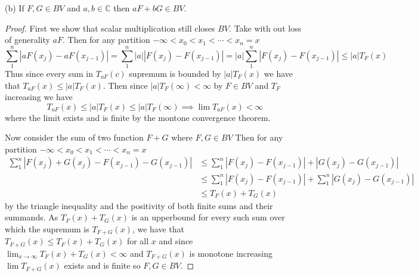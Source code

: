 \documentclass[11pt]{amsart}
\theoremstyle{definition}
\numberwithin{theorem}{section}
\numberwithin{definition}{section}
\numberwithin{equation}{section}
\begin{document}
(b) If $F, G \in BV$ and $a,b \in \mathbb{C}$ then $aF + bG \in BV.$
\begin{proof}
	First we show that scalar multiplication still closes $BV$. Take with out loss of generality $aF.$ Then 
	for any partition $-\infty < x_0 < x_1 < \cdots < x_n = x$
	\begin{equation*}
		\sum_{1}^n |aF(x_j) - aF(x_{j-1})| = \sum_{1}^n |a||F(x_j) - F(x_{j-1})| = |a|\sum_{1}^n |F(x_j) - F(x_{j-1})| \leq |a|T_F(x)
	\end{equation*}
	Thus since every sum in $T_{aF}(c)$ supremum is bounded by $|a|T_F(x)$ we have that $T_{aF}(x) \leq |a|T_F(x)$. Then since $ |a|T_F(\infty) < \infty$ by $F \in BV$ and $T_F$ increasing we have 
	\begin{equation*}
		T_{aF}(x) \leq   |a|T_F(x) \leq  |a|T_F(\infty) \implies \lim T_{aF}(x) < \infty
	\end{equation*}
	where the limit exists and is finite by the montone convergence theorem.

	Now consider the sum of two function $F +G$ where $F,G \in BV$
	Then 
	for any partition $-\infty < x_0 < x_1 < \cdots < x_n = x$
	\begin{equation*}
	\begin{aligned}
		\sum_{1}^n |F(x_j) + G(x_j)  - F(x_{j-1}) - G(x_{j-1})| &\leq  \sum_{1}^n |F(x_j) - F(x_{j-1})| + |G(x_j)   - G(x_{j-1})| \\
		&\leq \sum_{1}^n |F(x_j) - F(x_{j-1})| + \sum_{1}^n  |G(x_j)   - G(x_{j-1})| \\
		&\leq T_F(x) + T_G(x)
	\end{aligned}
	\end{equation*}
	by the triangle inequality and the positivity of both finite sums and their summands. As $T_F(x) + T_G(x)$ is an upperbound
	for every such sum over which the supremum is $T_{F+G}(x)$, we have that $T_{F+G}(x) \leq T_F(x) + T_G(x)$ for all $x$ and since 
	$\lim_{x \to \infty} T_F(x) + T_G(x) < \infty$ and $T_{F+G}(x)$ is monotone increasing $\lim T_{F+G}(x)$ exists and is finite so
	$F, G \in BV$.
\end{proof}
\end{document}

